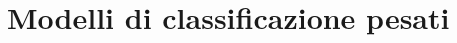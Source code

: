 \documentclass[main.tex]{subfiles}
\begin{document}
\section{Modelli di classificazione pesati}
\end{document}
